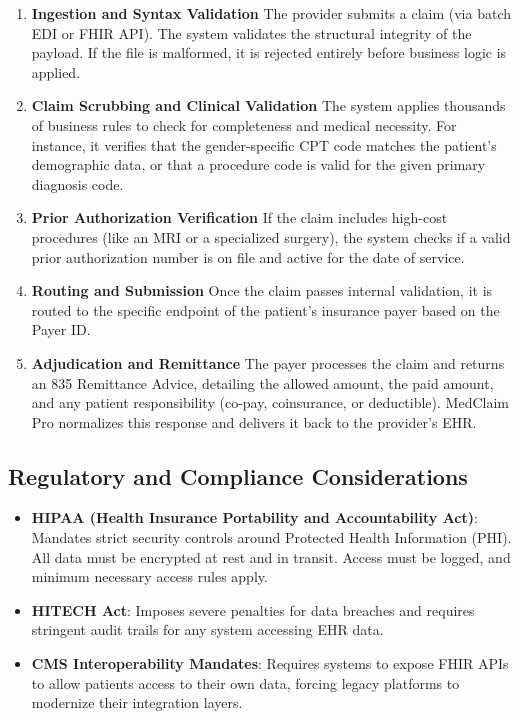 \begin{enumerate}
\def\labelenumi{\arabic{enumi}.}
\item
  \textbf{Ingestion and Syntax Validation} The provider submits a claim
  (via batch EDI or FHIR API). The system validates the structural
  integrity of the payload. If the file is malformed, it is rejected
  entirely before business logic is applied.
\item
  \textbf{Claim Scrubbing and Clinical Validation} The system applies
  thousands of business rules to check for completeness and medical
  necessity. For instance, it verifies that the gender-specific CPT code
  matches the patient's demographic data, or that a procedure code is
  valid for the given primary diagnosis code.
\item
  \textbf{Prior Authorization Verification} If the claim includes
  high-cost procedures (like an MRI or a specialized surgery), the
  system checks if a valid prior authorization number is on file and
  active for the date of service.
\item
  \textbf{Routing and Submission} Once the claim passes internal
  validation, it is routed to the specific endpoint of the patient's
  insurance payer based on the Payer ID.
\item
  \textbf{Adjudication and Remittance} The payer processes the claim and
  returns an 835 Remittance Advice, detailing the allowed amount, the
  paid amount, and any patient responsibility (co-pay, coinsurance, or
  deductible). MedClaim Pro normalizes this response and delivers it
  back to the provider's EHR.
\end{enumerate}

\subsection{Regulatory and Compliance
Considerations}\label{regulatory-and-compliance-considerations}

\begin{itemize}
\tightlist
\item
  \textbf{HIPAA (Health Insurance Portability and Accountability Act)}:
  Mandates strict security controls around Protected Health Information
  (PHI). All data must be encrypted at rest and in transit. Access must
  be logged, and minimum necessary access rules apply.
\item
  \textbf{HITECH Act}: Imposes severe penalties for data breaches and
  requires stringent audit trails for any system accessing EHR data.
\item
  \textbf{CMS Interoperability Mandates}: Requires systems to expose
  FHIR APIs to allow patients access to their own data, forcing legacy
  platforms to modernize their integration layers.
\end{itemize}

